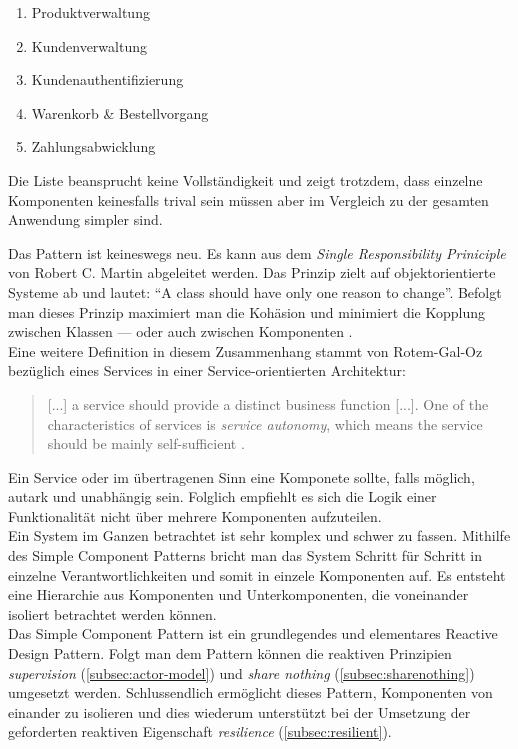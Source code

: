 \begin{enumerate}
\item Produktverwaltung
\item Kundenverwaltung
\item Kundenauthentifizierung
\item Warenkorb \& Bestellvorgang
\item Zahlungsabwicklung
\end{enumerate}

Die Liste beansprucht keine Vollständigkeit und zeigt trotzdem, dass einzelne Komponenten keinesfalls trival sein müssen aber im Vergleich zu der gesamten Anwendung simpler sind.

\pagebreak

Das Pattern ist keineswegs neu. Es kann aus dem \textit{Single Responsibility Priniciple} von Robert C. Martin abgeleitet werden. Das Prinzip zielt auf objektorientierte Systeme ab und lautet: \enquote{A class should have only one reason to change}. Befolgt man dieses Prinzip maximiert man die Kohäsion und minimiert die Kopplung zwischen Klassen --- oder auch zwischen Komponenten \cite[S.~185]{kuhn_reactive_2015} \cite{martin_single_2014}.\\
Eine weitere Definition in diesem Zusammenhang stammt von Rotem-Gal-Oz bezüglich eines Services in einer Service-orientierten Architektur:

\begin{quotation}
[...] a service should provide a distinct business function [...]. One of the characteristics of services is \textit{service autonomy}, which means the service should be mainly self-sufficient \cite[S.~7]{rotem_soa_2012}.
\end{quotation}

Ein Service oder im übertragenen Sinn eine Komponete sollte, falls möglich, autark und unabhängig sein. Folglich empfiehlt es sich die Logik einer Funktionalität nicht über mehrere Komponenten aufzuteilen.\\

Ein System im Ganzen betrachtet ist sehr komplex und schwer zu fassen. Mithilfe des Simple Component Patterns bricht man das System Schritt für Schritt in einzelne Verantwortlichkeiten und somit in einzele Komponenten auf. Es entsteht eine Hierarchie aus Komponenten und Unterkomponenten, die voneinander isoliert betrachtet werden können.\\
Das Simple Component Pattern ist ein grundlegendes und elementares Reactive Design Pattern. Folgt man dem Pattern können die reaktiven Prinzipien \textit{supervision} (\ref{subsec:actor-model}) und \textit{share nothing} (\ref{subsec:sharenothing}) umgesetzt werden. Schlussendlich ermöglicht dieses Pattern, Komponenten von einander zu isolieren und dies wiederum unterstützt bei der Umsetzung der geforderten reaktiven Eigenschaft \textit{resilience} (\ref{subsec:resilient}).

